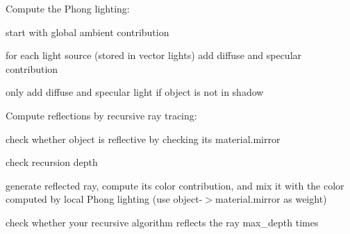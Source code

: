 
\begin{DoxyRefList}
\item[\label{todo__todo000002}%
\hypertarget{todo__todo000002}{}%
Member \hyperlink{classScene_a8c3c270f36a5e73805d925763450de7c}{Scene\+:\+:lighting} (const \hyperlink{classvec3}{vec3} \&\+\_\+point, const \hyperlink{classvec3}{vec3} \&\+\_\+normal, const \hyperlink{classvec3}{vec3} \&\+\_\+view, const \hyperlink{structMaterial}{Material} \&\+\_\+material)]Compute the Phong lighting\+:
\begin{DoxyItemize}
\item start with global ambient contribution
\item for each light source (stored in vector {\ttfamily lights}) add diffuse and specular contribution
\item only add diffuse and specular light if object is not in shadow 
\end{DoxyItemize}
\item[\label{todo__todo000001}%
\hypertarget{todo__todo000001}{}%
Member \hyperlink{classScene_aee2e562b23da56880ea30e33f9e76e1b}{Scene\+:\+:trace} (const \hyperlink{classRay}{Ray} \&\+\_\+ray, int \+\_\+depth)]Compute reflections by recursive ray tracing\+:
\begin{DoxyItemize}
\item check whether {\ttfamily object} is reflective by checking its {\ttfamily material.\+mirror}
\item check recursion depth
\item generate reflected ray, compute its color contribution, and mix it with the color computed by local Phong lighting (use {\ttfamily object-\/$>$material.\+mirror} as weight)
\item check whether your recursive algorithm reflects the ray {\ttfamily max\+\_\+depth} times 
\end{DoxyItemize}
\end{DoxyRefList}